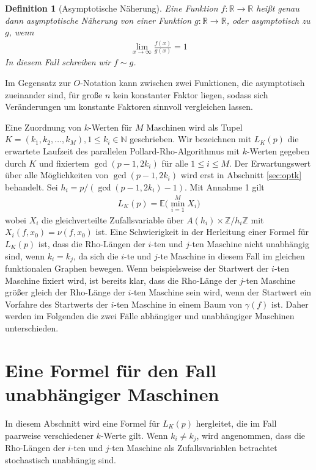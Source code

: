 \documentclass[a4paper, 10pt, ngerman]{article}
\newcommand{\E}{\mathbb{E}}
\newcommand{\N}{\mathbb{N}}
\newcommand{\R}{\mathbb{R}}
\newcommand{\Z}{\mathbb{Z}}
\newtheorem{definition}{Definition}
\begin{document}
\begin{definition}[Asymptotische Näherung]
    Eine Funktion $f : \R \to \R$ heißt genau dann asymptotische Näherung von einer Funktion $g : \R \to \R$, oder asymptotisch zu $g$, wenn
    \begin{align*}
        \lim_{x \to \infty} \frac {f(x)} {g(x)} = 1
    \end{align*}
    In diesem Fall schreiben wir $f \sim g$.
\end{definition}

\noindent Im Gegensatz zur $O$-Notation kann zwischen zwei Funktionen, die asymptotisch zueinander sind, für große $n$ kein konstanter Faktor liegen, sodass sich Veränderungen um konstante Faktoren sinnvoll vergleichen lassen.

Eine Zuordnung von $k$-Werten für $M$ Maschinen wird als Tupel $K = (k_1, k_2, \dots, k_M), 1 \le k_i \in \N$ geschrieben.  Wir bezeichnen mit $L_K(p)$ die erwartete Laufzeit des parallelen Pollard-Rho-Algorithmus mit $k$-Werten gegeben durch $K$ und fixiertem $\gcd(p - 1, 2k_i)$ für alle $1 \le i \le M$. Der Erwartungswert über alle Möglichkeiten von $\gcd(p - 1, 2k_i)$ wird erst in Abschnitt \ref{sec:optk} behandelt. Sei $h_i = p/(\gcd(p - 1, 2k_i) - 1)$. Mit Annahme 1 gilt
\begin{align*}
    L_K(p) = \E \bigg ( \min_{i = 1}^M X_i \bigg )
\end{align*}
wobei $X_i$ die gleichverteilte Zufallsvariable über $A(h_i) \times \Z/h_i\Z$ mit $X_i(f, x_0) = \nu(f, x_0)$ ist. Eine Schwierigkeit in der Herleitung einer Formel für $L_K(p)$ ist, dass die Rho-Längen der $i$-ten und $j$-ten Maschine nicht unabhängig sind, wenn $k_i = k_j$, da sich die $i$-te und $j$-te Maschine in diesem Fall im gleichen funktionalen Graphen bewegen. Wenn beispielsweise der Startwert der $i$-ten Maschine fixiert wird, ist bereits klar, dass die Rho-Länge der $j$-ten Maschine größer gleich der Rho-Länge der $i$-ten Maschine sein wird, wenn der Startwert ein Vorfahre des Startwerts der $i$-ten Maschine in einem Baum von $\gamma(f)$ ist. Daher werden im Folgenden die zwei Fälle abhängiger und unabhängiger Maschinen unterschieden.


\section{Eine Formel für den Fall unabhängiger Maschinen}

In diesem Abschnitt wird eine Formel für $L_K(p)$ hergleitet, die im Fall paarweise verschiedener $k$-Werte gilt. Wenn $k_i \ne k_j$, wird angenommen, dass die Rho-Längen der $i$-ten und $j$-ten Maschine als Zufallsvariablen betrachtet stochastisch unabhängig sind.
\end{document}
